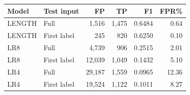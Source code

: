 \centering\footnotesize
\begin{tabular}{@{}llrrrr@{}}
\toprule
Model & Test input & FP & TP & F1 & FPR\%\\\midrule
LENGTH & Full & 1,516 & 1,475 & 0.6484 & 0.64\\
LENGTH & First label & 245 & 820 & 0.6250 & 0.10\\
LR8 & Full & 4,739 & 906 & 0.2515 & 2.01\\
LR8 & First label & 12,039 & 1,049 & 0.1432 & 5.10\\
LR4 & Full & 29,187 & 1,559 & 0.0965 & 12.36\\
LR4 & First label & 19,524 & 1,122 & 0.1011 & 8.27\\
\bottomrule
\end{tabular}
